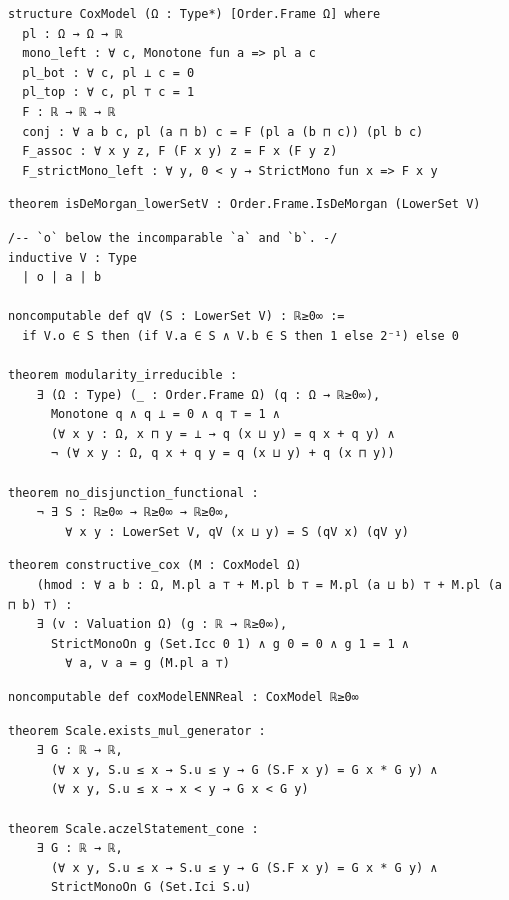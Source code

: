 \label{lean:coxmodel}
\begin{lstlisting}
structure CoxModel (Ω : Type*) [Order.Frame Ω] where
  pl : Ω → Ω → ℝ
  mono_left : ∀ c, Monotone fun a => pl a c
  pl_bot : ∀ c, pl ⊥ c = 0
  pl_top : ∀ c, pl ⊤ c = 1
  F : ℝ → ℝ → ℝ
  conj : ∀ a b c, pl (a ⊓ b) c = F (pl a (b ⊓ c)) (pl b c)
  F_assoc : ∀ x y z, F (F x y) z = F x (F y z)
  F_strictMono_left : ∀ y, 0 < y → StrictMono fun x => F x y
\end{lstlisting}

\label{lean:isdemorgan-lowersetv}
\begin{lstlisting}
theorem isDeMorgan_lowerSetV : Order.Frame.IsDeMorgan (LowerSet V)
\end{lstlisting}

\label{lean:no-disjunction-functional}
\begin{lstlisting}
/-- `o` below the incomparable `a` and `b`. -/
inductive V : Type
  | o | a | b

noncomputable def qV (S : LowerSet V) : ℝ≥0∞ :=
  if V.o ∈ S then (if V.a ∈ S ∧ V.b ∈ S then 1 else 2⁻¹) else 0

theorem modularity_irreducible :
    ∃ (Ω : Type) (_ : Order.Frame Ω) (q : Ω → ℝ≥0∞),
      Monotone q ∧ q ⊥ = 0 ∧ q ⊤ = 1 ∧
      (∀ x y : Ω, x ⊓ y = ⊥ → q (x ⊔ y) = q x + q y) ∧
      ¬ (∀ x y : Ω, q x + q y = q (x ⊔ y) + q (x ⊓ y))

theorem no_disjunction_functional :
    ¬ ∃ S : ℝ≥0∞ → ℝ≥0∞ → ℝ≥0∞,
        ∀ x y : LowerSet V, qV (x ⊔ y) = S (qV x) (qV y)
\end{lstlisting}

\label{lean:constructive-cox}
\begin{lstlisting}
theorem constructive_cox (M : CoxModel Ω)
    (hmod : ∀ a b : Ω, M.pl a ⊤ + M.pl b ⊤ = M.pl (a ⊔ b) ⊤ + M.pl (a ⊓ b) ⊤) :
    ∃ (v : Valuation Ω) (g : ℝ → ℝ≥0∞),
      StrictMonoOn g (Set.Icc 0 1) ∧ g 0 = 0 ∧ g 1 = 1 ∧
        ∀ a, v a = g (M.pl a ⊤)
\end{lstlisting}

\label{lean:coxmodelennreal}
\begin{lstlisting}
noncomputable def coxModelENNReal : CoxModel ℝ≥0∞
\end{lstlisting}

\label{lean:exists-mul-generator}
\begin{lstlisting}
theorem Scale.exists_mul_generator :
    ∃ G : ℝ → ℝ,
      (∀ x y, S.u ≤ x → S.u ≤ y → G (S.F x y) = G x * G y) ∧
      (∀ x y, S.u ≤ x → x < y → G x < G y)

theorem Scale.aczelStatement_cone :
    ∃ G : ℝ → ℝ,
      (∀ x y, S.u ≤ x → S.u ≤ y → G (S.F x y) = G x * G y) ∧
      StrictMonoOn G (Set.Ici S.u)
\end{lstlisting}

